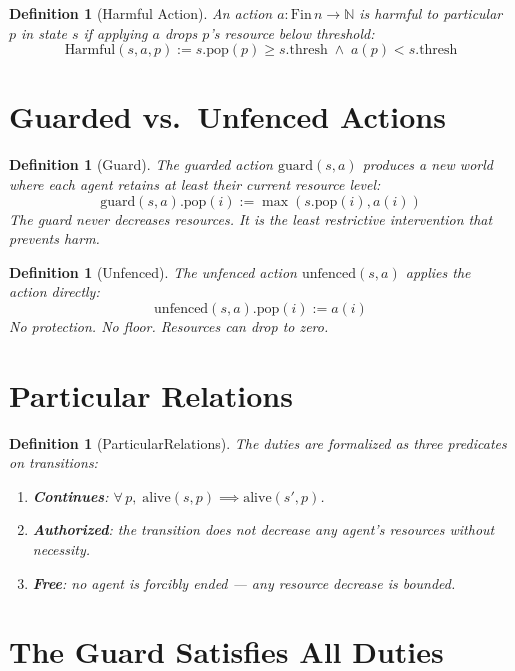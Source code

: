 \documentclass[12pt,a4paper]{article}
\newtheorem{definition}[theorem]{Definition}
\begin{document}
\begin{definition}[Harmful Action]
An action $a : \text{Fin}\, n \to \mathbb{N}$ is \emph{harmful} to
particular $p$ in state $s$ if applying $a$ drops $p$'s resource below
threshold:
\[
\text{Harmful}(s, a, p) := s.\text{pop}(p) \geq s.\text{thresh}
\;\wedge\; a(p) < s.\text{thresh}
\]
\end{definition}

\section{Guarded vs.\ Unfenced Actions}

\begin{definition}[Guard]
The guarded action $\text{guard}(s, a)$ produces a new world where
each agent retains at least their current resource level:
\[
\text{guard}(s, a).\text{pop}(i) := \max(s.\text{pop}(i), a(i))
\]
The guard never decreases resources. It is the least restrictive
intervention that prevents harm.
\end{definition}

\begin{definition}[Unfenced]
The unfenced action $\text{unfenced}(s, a)$ applies the action directly:
\[
\text{unfenced}(s, a).\text{pop}(i) := a(i)
\]
No protection. No floor. Resources can drop to zero.
\end{definition}

\section{Particular Relations}

\begin{definition}[ParticularRelations]
The duties are formalized as three predicates on transitions:
\begin{enumerate}
    \item \textbf{Continues}: $\forall\, p,\; \text{alive}(s, p) \implies \text{alive}(s', p)$.
    \item \textbf{Authorized}: the transition does not decrease any agent's resources
    without necessity.
    \item \textbf{Free}: no agent is forcibly ended --- any resource decrease is bounded.
\end{enumerate}
\end{definition}

\section{The Guard Satisfies All Duties}
\end{document}
